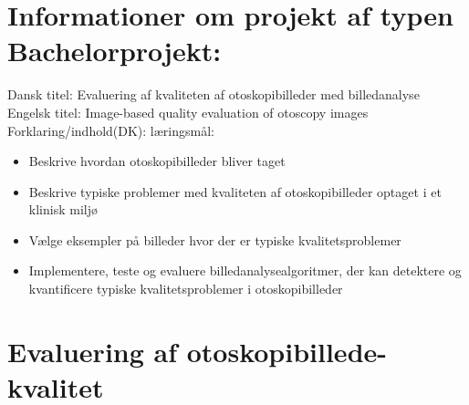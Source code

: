 \section*{Informationer om projekt af typen Bachelorprojekt:}
Dansk titel:                    Evaluering af kvaliteten af otoskopibilleder med billedanalyse\\
Engelsk titel:                  Image-based quality evaluation of otoscopy images\\
Forklaring/indhold(DK):         læringsmål:
\begin{itemize}
    \item Beskrive hvordan otoskopibilleder bliver taget
    \item Beskrive typiske problemer med kvaliteten af otoskopibilleder optaget i et klinisk miljø
    \item Vælge eksempler på billeder hvor der er typiske kvalitetsproblemer
    \item Implementere, teste og evaluere billedanalysealgoritmer, der kan detektere og kvantificere typiske kvalitetsproblemer i otoskopibilleder
\end{itemize}


\section*{Evaluering af otoskopibillede-kvalitet}

